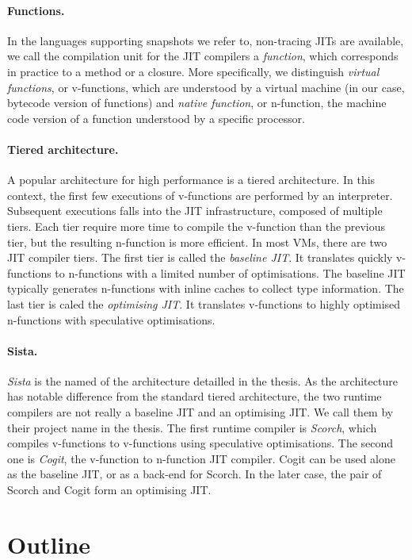 \documentclass[a4paper,12pt,twoside]{../includes/ThesisStyle}
\begin{document}
\paragraph{Functions.} In the languages supporting snapshots we refer to, non-tracing JITs are available, we call the compilation unit for the JIT compilers a \emph{function}, which corresponds in practice to a method or a closure. More specifically, we distinguish \emph{virtual functions}, or v-functions, which are understood by a virtual machine (in our case, bytecode version of functions) and \emph{native function}, or n-function, the machine code version of a function understood by a specific processor.

\paragraph{Tiered architecture.} A popular architecture for high performance is a tiered architecture. In this context, the first few executions of v-functions are performed by an interpreter. Subsequent executions falls into the JIT infrastructure, composed of multiple tiers. Each tier require more time to compile the v-function than the previous tier, but the resulting n-function is more efficient. In most VMs, there are two JIT compiler tiers. The first tier is called the \emph{baseline JIT}. It translates quickly v-functions to n-functions with a limited number of optimisations. The baseline JIT typically generates n-functions with inline caches to collect type information. The last tier is caled the \emph{optimising JIT}. It translates v-functions to highly optimised n-functions with speculative optimisations.

\paragraph{Sista.} \emph{Sista} is the named of the architecture detailled in the thesis. As the architecture has notable difference from the standard tiered architecture, the two runtime compilers are not really a baseline JIT and an optimising JIT. We call them by their project name in the thesis. The first runtime compiler is \emph{Scorch}, which compiles v-functions to v-functions using speculative optimisations. The second one is \emph{Cogit}, the v-function to n-function JIT compiler. Cogit can be used alone as the baseline JIT, or as a back-end for Scorch. In the later case, the pair of Scorch and Cogit form an optimising JIT.

\section{Outline}
\end{document}
